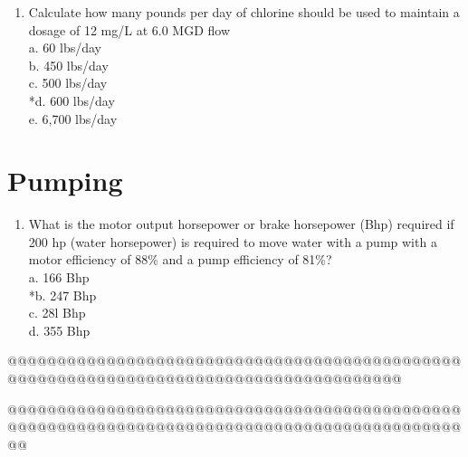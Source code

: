 \documentclass{article}
\begin{document}
\begin{enumerate}
\item Calculate how many pounds per day of chlorine should be used to maintain a dosage of 12 mg/L at 6.0 MGD flow\\

a. 60 lbs/day \\
b. 450 lbs/day \\
c. 500 lbs/day \\
*d. 600 lbs/day \\
e. 6,700 lbs/day 

\end{enumerate}

\section{Pumping}
\begin{enumerate}
\item What is the motor output horsepower or brake horsepower (Bhp) required if 200 hp (water horsepower) is required to move water with a pump with a motor efficiency of 88\% and a pump efficiency of 81\%?\\
a.	166 Bhp\\
*b.	247 Bhp\\
c.	28l Bhp\\
d.	355 Bhp\\

\end{enumerate}

@@@@@@@@@@@@@@@@@@@@@@@@@@@@@@@@@@@@@@@@@@@@@@@@@@@@@@@@@@@@@@@@@@@@@@@@@@@@@@@@@@@@@@




















@@@@@@@@@@@@@@@@@@@@@@@@@@@@@@@@@@@@@@@@@@@@@@@@@@@@@@@@@@@@@@@@@@@@@@@@@@@@@@@@@@@@@@@@@@@@@@
\end{document}

